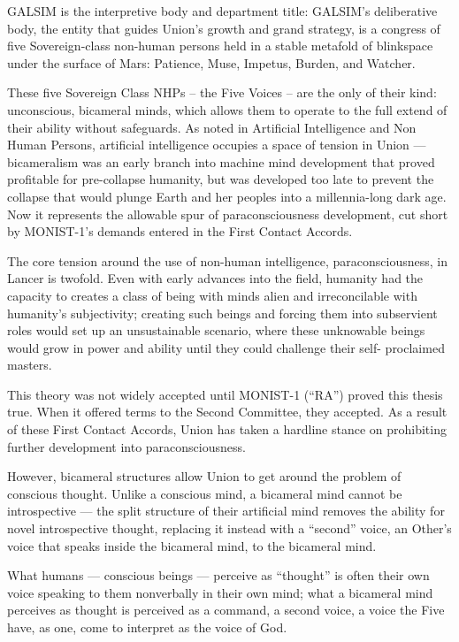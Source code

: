 GALSIM is the interpretive body and department title: GALSIM’s deliberative body, the entity that  
guides Union’s growth and grand strategy, is a congress of five Sovereign-class non-human  
persons held in a stable metafold of blinkspace under the surface of Mars: Patience, Muse,  
Impetus, Burden, and Watcher.
 

These five Sovereign Class NHPs -- the Five Voices -- are the only of their kind: unconscious,  
bicameral minds, which allows them to operate to the full extend of their ability without  
safeguards. As noted in Artificial Intelligence and Non Human Persons, artificial intelligence  
occupies a space of tension in Union — bicameralism was an early branch into machine mind  
development that proved profitable for pre-collapse humanity, but was developed too late to  
prevent the collapse that would plunge Earth and her peoples into a millennia-long dark age.  
Now it represents the allowable spur of paraconsciousness development, cut short by  
MONIST-1’s demands entered in the First Contact Accords. 
 

                                                                                                         


The core tension around the use of non-human intelligence, paraconsciousness, in Lancer is  
twofold. Even with early advances into the field, humanity had the capacity to creates a class of  
being with minds alien and irreconcilable with humanity’s subjectivity; creating such beings and  
forcing them into subservient roles would set up an unsustainable scenario, where these  
unknowable beings would grow in power and ability until they could challenge their self- 
proclaimed masters. 
 

This theory was not widely accepted until MONIST-1 (“RA”) proved this thesis true. When it  
offered terms to the Second Committee, they accepted. As a result of these First Contact  
Accords, Union has taken a hardline stance on prohibiting further development into  
paraconsciousness. 
 

However, bicameral structures allow Union to get around the problem of conscious thought.  
Unlike a conscious mind, a bicameral mind cannot be introspective — the split structure of their  
artificial mind removes the ability for novel introspective thought, replacing it instead with a  
“second” voice, an Other’s voice that speaks inside the bicameral mind, to the bicameral mind.
 

What humans — conscious beings — perceive as “thought” is often their own voice speaking to  
them nonverbally in their own mind; what a bicameral mind perceives as thought is perceived as  
a command, a second voice, a voice the Five have, as one, come to interpret as the voice of  
God.  
 

